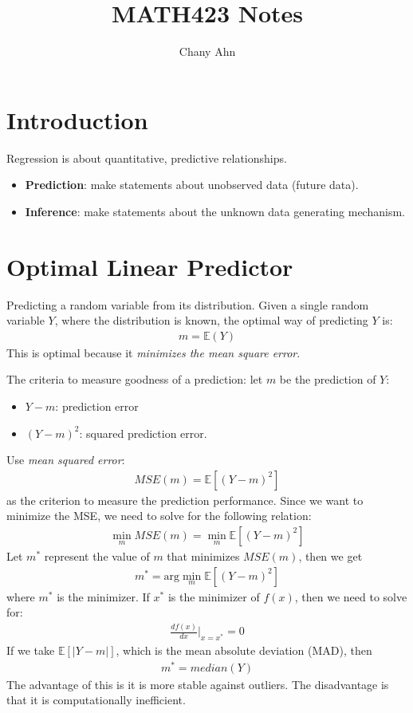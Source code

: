 \documentclass{article}
\title{MATH423 Notes}
\author{Chany Ahn}
\date{}
\newcommand{\E}{\mathbb{E}}
\begin{document}
\maketitle
\newpage
\tableofcontents
\newpage
\section{Introduction}
Regression is about quantitative, predictive relationships.
\begin{itemize}
    \item \textbf{Prediction}: make statements about unobserved data (future data).
    \item \textbf{Inference}: make statements about the unknown data generating mechanism.
\end{itemize}
\section{Optimal Linear Predictor}
Predicting a random variable from its distribution. Given a single random variable $Y$, where the distribution is known, the optimal way of predicting $Y$ is:
\begin{align}
    m = \E(Y)
\end{align}
This is optimal because it \textit{minimizes the mean square error}.

The criteria to measure goodness of a prediction: let $m$ be the prediction of $Y$:
\begin{itemize}
    \item $Y - m$: prediction error
    \item $(Y-m)^2$: squared prediction error.
\end{itemize}
Use \textit{mean squared error}:
\begin{align}
    MSE(m) = \E[(Y - m)^2]
\end{align}
as the criterion to measure the prediction performance. Since we want to minimize the MSE, we need to solve for the following relation:
\begin{align}
    \min_m MSE(m) = \min_m \E[(Y-m)^2]
\end{align}
Let $m^*$ represent the value of $m$ that minimizes $MSE(m)$, then we get 
\begin{align}
    m^* = \text{arg}\min_m \E[(Y-m)^2]
\end{align}
where $m^*$ is the minimizer. If $x^*$ is the minimizer of $f(x)$, then we need to solve for:
\begin{align}
    \frac{df(x)}{dx}\bigg|_{x=x^*} = 0
\end{align}
If we take $\E[|Y - m|]$, which is the mean absolute deviation (MAD), then
\begin{align}
    m^* = median(Y)
\end{align}
The advantage of this is it is more stable against outliers. The disadvantage is that it is computationally inefficient.
\end{document}

